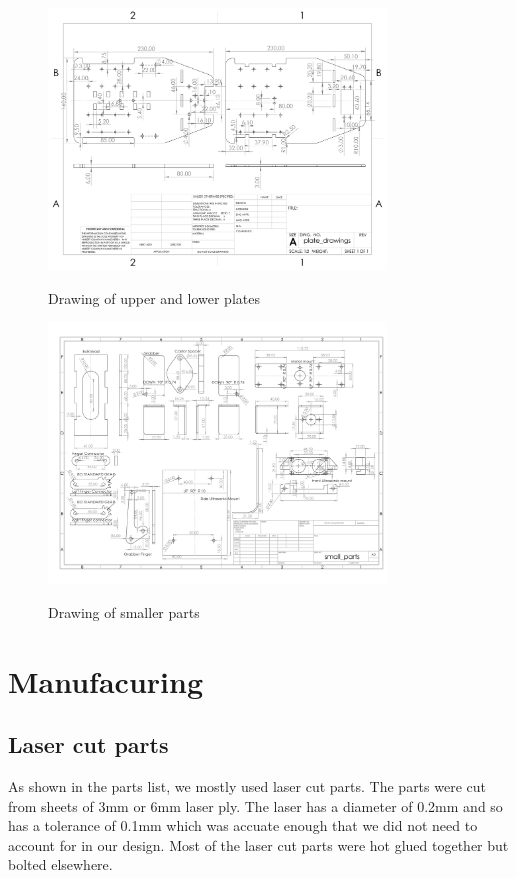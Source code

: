 \documentclass{article}
\begin{document}
\begin{figure}[H]
    \centering
    \includegraphics[width=0.8\textwidth]{assets/plate_drawings.JPG}
    \label{fig:plate_drawings}
    \caption{Drawing of upper and lower plates}
\end{figure}

\begin{figure}[H]
    \centering
    \includegraphics[width=0.8\textwidth]{assets/small_parts.JPG}
    \label{fig:smaller_parts}
    \caption{Drawing of smaller parts}
\end{figure}

\section{Manufacuring}

\subsection{Laser cut parts}
\quad As shown in the parts list, we mostly used laser cut parts. The parts were cut from sheets of 3mm or 6mm laser ply. The laser has a diameter of 0.2mm and so has a tolerance of 0.1mm which was accuate enough that we did not need to account for in our design. Most of the laser cut parts were hot glued together but bolted elsewhere.
\end{document}
